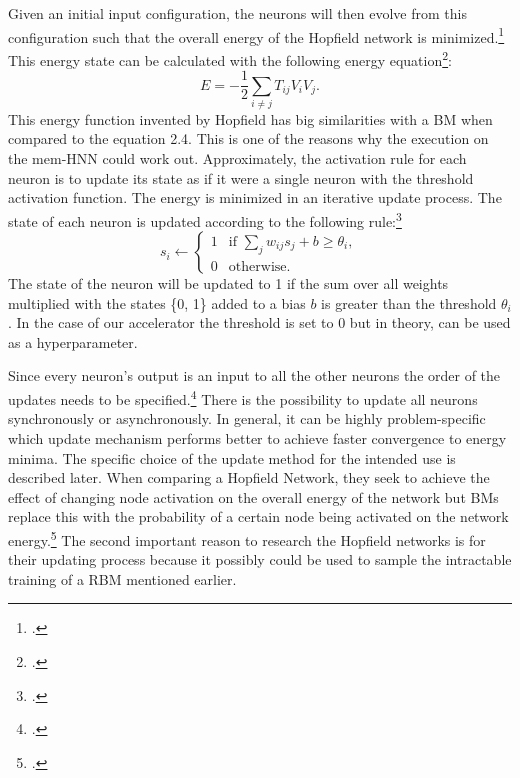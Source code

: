 Given an initial input configuration, the neurons will then evolve from this configuration such that the overall energy of the Hopfield network is minimized.\footcite[cf.][7]{ahadNeuralNetworksWireless2016}
This energy state can be calculated with the following energy equation\footcite[cf.][2556]{hopfieldNeuralNetworksPhysical1982}: 
\begin{equation}
    E = -\frac{1}{2} \sum_{i \neq j} T_{ij} V_i V_j .
\end{equation}
This energy function invented by Hopfield has big similarities with a \ac{BM} when compared to the
equation 2.4. This is one of the reasons why the execution on the \ac{mem-HNN} could work out.
Approximately, the activation rule for each neuron is to update its state as if it were a single neuron with the threshold activation function.
The energy is minimized in an iterative update process.
The state of each neuron is updated according to the following rule:\footcite[cf.][506]{mackayInformationTheoryInference2003}
\begin{equation}
    s_i \leftarrow 
    \begin{cases} 
    1 & \text{if } \sum_j w_{ij} s_j + b \geq \theta_i, \\
    0 & \text{otherwise}.
    \end{cases}
    \label{eq:update_rule}
\end{equation}
    The state of the neuron will be updated to 1 if the sum over all weights multiplied with the states \{0, 1\} added to a bias \( b \)  is greater than the threshold \( \theta_i \).
In the case of our accelerator the threshold is set to 0 but in theory, can be used as a hyperparameter.

Since every neuron's output is an input to all the other neurons the order of the updates needs to be specified.\footcite[cf.][506]{mackayInformationTheoryInference2003}
There is the possibility to update all neurons synchronously or asynchronously. 
In general, it can be highly problem-specific which update mechanism performs better to achieve faster convergence to energy minima.
The specific choice of the update method for the intended use is described later.
When comparing a Hopfield Network, they seek to achieve the effect of changing node activation on the overall energy of the network but \ac{BM}s replace this with the probability of a certain node being activated on the network energy.\footcite[cf.][7]{ahadNeuralNetworksWireless2016}
The second important reason to research the Hopfield networks is for their updating process because it possibly could be used to sample the intractable training of a \ac{RBM} mentioned earlier.

